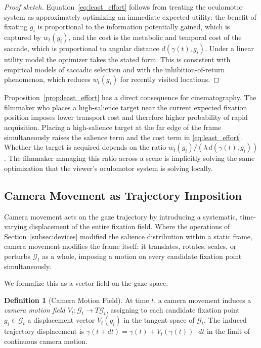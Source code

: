 \documentclass[12pt, a4paper]{article}
\theoremstyle{plain}
\theoremstyle{definition}
\newtheorem{definition}[theorem]{Definition}
\theoremstyle{remark}
\newcommand{\G}{\mathcal{G}}
\newcommand{\traj}{\gamma}
\newcommand{\salience}{w}
\begin{document}
\begin{proof}[Proof sketch]
  Equation~\eqref{eq:least_effort} follows from treating
  the oculomotor system as approximately optimizing an
  immediate expected utility: the benefit of fixating $g_i$
  is proportional to the information potentially gained,
  which is captured by $\salience_t(g_i)$, and the cost
  is the metabolic and temporal cost of the saccade,
  which is proportional to angular distance $d(\traj(t),
  g_i)$. Under a linear utility model the optimizer takes
  the stated form. This is consistent with empirical models
  of saccadic selection \cite{itti1998} and with the
  inhibition-of-return phenomenon, which reduces
  $\salience_t(g_i)$ for recently visited locations.
\end{proof}

Proposition~\ref{prop:least_effort} has a direct
consequence for cinematography. The filmmaker who places a
high-salience target near the current expected fixation
position imposes lower transport cost and therefore higher
probability of rapid acquisition. Placing a high-salience
target at the far edge of the frame simultaneously raises
the salience term and the cost term in
\eqref{eq:least_effort}. Whether the target is acquired
depends on the ratio $\salience_t(g_i) / (\lambda\,
d(\traj(t), g_i))$. The filmmaker managing this ratio
across a scene is implicitly solving the same optimization
that the viewer's oculomotor system is solving locally.

\subsection{Camera Movement as Trajectory Imposition}
\label{subsec:camera}

Camera movement acts on the gaze trajectory by introducing
a systematic, time-varying displacement of the entire
fixation field. Where the operations of Section~\ref{subsec:devices}
modified the salience distribution within a static frame,
camera movement modifies the frame itself: it translates,
rotates, scales, or perturbs $\G_t$ as a whole, imposing
a motion on every candidate fixation point simultaneously.

We formalize this as a vector field on the gaze space.

\begin{definition}[Camera Motion Field]
  At time $t$, a camera movement induces a \emph{camera
  motion field} $V_t : \G_t \to T\G_t$, assigning to each
  candidate fixation point $g_i \in \G_t$ a displacement
  vector $V_t(g_i)$ in the tangent space of $\G_t$. The
  induced trajectory displacement is
  $\traj(t+dt) = \traj(t) + V_t(\traj(t)) \cdot dt$
  in the limit of continuous camera motion.
\end{definition}
\end{document}

